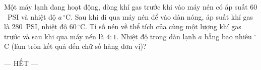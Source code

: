 \begin{ex}
\begin{center}
		\end{center}
		Một máy lạnh đang hoạt động, dòng khí gas trước khi vào máy nén có áp suất $60$~PSI và nhiệt độ $a\,^\circ\text{C}$. Sau khi đi qua máy nén để vào dàn nóng, áp suất khí gas là $280$~PSI, nhiệt độ $60\,^\circ\text{C}$. Tỉ số nén về thể tích của cùng một lượng khí gas trước và sau khi qua máy nén là $4:1$. Nhiệt độ trong dàn lạnh $a$ bằng bao nhiêu $^\circ$C (làm tròn kết quả đến chữ số hàng đơn vị)?
		\par
		\loigiai{
			\[\dfrac{p_1V_1}{T_1}=\dfrac{p_2V_2}{T_2}\Rightarrow T_1=T_2\cdot\dfrac{p_1}{p_2}\cdot\dfrac{V_1}{V_2}=333\cdot\dfrac{60}{280}\cdot 4\approx 285{,}4~\text{K}\Rightarrow a\approx 12\,^\circ\text{C}.\]
		}
	\end{ex}

	\centerline{--- HẾT ---}


